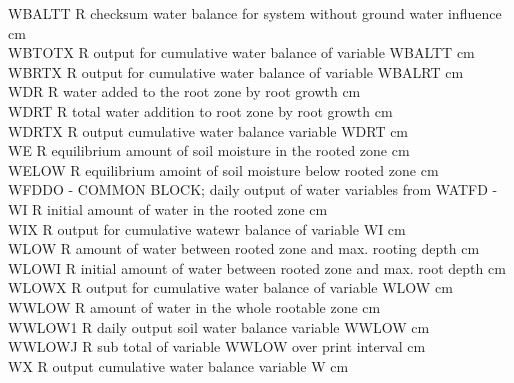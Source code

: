 \documentclass[11pt]{article}
\begin{document}
\begin{tabbing}
WBALTT\> \> R\> checksum water balance for system without ground water influence\> \> \> \> \> \> \> cm\\
WBTOTX\> \> R\> output for cumulative water balance of variable WBALTT\> \> \> \> \> \> \> cm\\
WBRTX\> \> R\> output for cumulative water balance of variable WBALRT\> \> \> \> \> \> \> cm\\
WDR\> \> R\> water added to the root zone by root growth\> \> \> \> \> \> \> cm\\
WDRT\> \> R\> total water addition to root zone by root growth\> \> \> \> \> \> \> cm\\
WDRTX\> \> R\> output cumulative water balance variable WDRT\> \> \> \> \> \> \> cm\\
WE\> \> R\> equilibrium amount of soil moisture in the rooted zone\> \> \> \> \> \> \> cm\\
WELOW\> \> R\> equilibrium amoint of soil moisture below rooted zone\> \> \> \> \> \> \> cm\\
WFDDO\> \> -\> COMMON BLOCK; daily output of water variables from WATFD\> \> \> \> \> \> \> -\\
WI\> \> R\> initial amount of water in the rooted zone\> \> \> \> \> \> \> cm\\
WIX\> \> R\> output for cumulative watewr balance of variable WI\> \> \> \> \> \> \> cm\\
WLOW\> \> R\> amount of water between rooted zone and max. rooting depth\> \> \> \> \> \> \> cm\\
WLOWI\> \> R\> initial amount of water between rooted zone and max. root depth\> \> \> \> \> \> \> cm\\
WLOWX\> \> R\> output for cumulative water balance of variable WLOW\> \> \> \> \> \> \> cm\\
WWLOW\> \> R\> amount of water in the whole rootable zone\> \> \> \> \> \> \> cm\\
WWLOW1\> \> R\> daily output soil water balance variable WWLOW\> \> \> \> \> \> \> cm\\
WWLOWJ\> \> R\> sub total of variable WWLOW over print interval\> \> \> \> \> \> \> cm\\
WX\> \> R\> output cumulative water balance variable W\> \> \> \> \> \> \> cm
\end{tabbing}
\end{document}
